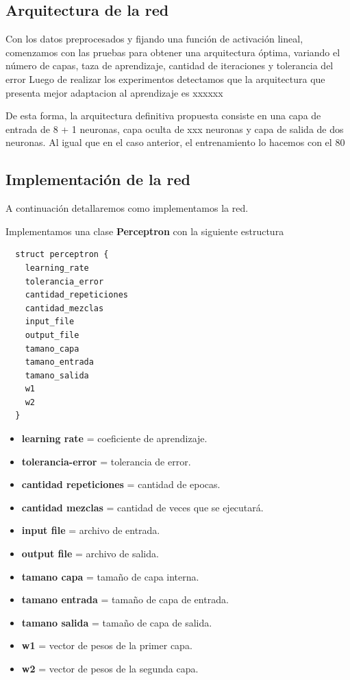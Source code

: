 \documentclass[onecolumn,10pt]{article}
\begin{document}
\subsection{Arquitectura de la red}

Con los datos preprocesados y fijando una función de activación lineal, comenzamos con las pruebas para obtener una arquitectura óptima, variando el número de capas, taza de aprendizaje, cantidad de iteraciones y tolerancia del error
Luego de realizar los experimentos detectamos que la arquitectura que presenta mejor adaptacion al aprendizaje es xxxxxx

De esta forma, la arquitectura definitiva propuesta consiste en una capa de entrada de 8 + 1 neuronas, capa oculta de xxx neuronas y capa de salida de dos neuronas.  Al igual que en el caso anterior, el entrenamiento lo hacemos con el 80%


\subsection{Implementación de la red}

A continuación detallaremos como implementamos la red.


Implementamos una clase \textbf{Perceptron} con la siguiente estructura

\begin{lstlisting}
  struct perceptron {
    learning_rate 
    tolerancia_error
    cantidad_repeticiones
    cantidad_mezclas
    input_file 
    output_file
    tamano_capa
    tamano_entrada
    tamano_salida 
    w1  
    w2  
  }

\end{lstlisting}


\begin{itemize}
\item \textbf{learning rate} = coeficiente de aprendizaje.
\item \textbf{tolerancia-error} = tolerancia de error.
\item \textbf{cantidad repeticiones} = cantidad de epocas.
\item \textbf{cantidad mezclas} = cantidad de veces que se ejecutará.
\item \textbf{input file} = archivo de entrada.
\item \textbf{output file} = archivo de salida.
\item \textbf{tamano capa} = tamaño de capa interna.
\item \textbf{tamano entrada} = tamaño de capa de entrada.
\item \textbf{tamano salida} = tamaño de capa de salida.
\item \textbf{w1} = vector de pesos de la primer capa.
\item \textbf{w2} = vector de pesos de la segunda capa.
\end{itemize}
\end{document}
